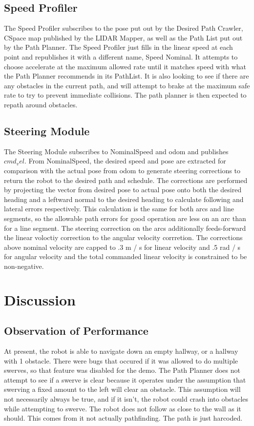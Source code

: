 \documentclass{article}
\begin{document}
\subsection{Speed Profiler}

The Speed Profiler subscribes to the pose put out by the Desired Path Crawler, CSpace map published by the LIDAR Mapper, as well as the Path List put out by the Path Planner.
The Speed Profiler just fills in the linear speed at each point and republishes it with a different name, Speed Nominal.
It attempts to choose accelerate at the maximum allowed rate until it matches speed with what the Path Planner recommends in its PathList.
It is also looking to see if there are any obstacles in the current path, and will attempt to brake at the maximum safe rate to try to prevent immediate collisions.
The path planner is then expected to repath around obstacles.

\subsection{Steering Module}

The Steering Module subscribes to NominalSpeed and odom and publishes $cmd_vel$.
From NominalSpeed, the desired speed and pose are extracted for comparison with the actual pose from odom to generate steering corrections to return the robot to the desired path and schedule.
The corrections are performed by projecting the vector from desired pose to actual pose onto both the desired heading and a leftward normal to the desired heading to calculate following and lateral errors respectively.
This calculation is the same for both arcs and line segments, so the allowable path errors for good operation are less on an arc than for a line segment.
The steering correction on the arcs additionally feeds-forward the linear voloctiy correction to the angular velocity corrretion.
The corrections above nominal velocity are capped to .3 m / s for linear velocity and .5 rad / s for angular velocity and the total commanded linear velocity is constrained to be non-negative.

\section{Discussion}
\subsection{Observation of Performance}

At present, the robot is able to navigate down an empty hallway, or a hallway with 1 obstacle.  There were bugs that occured if it was allowed to do multiple swerves, so that feature was disabled for the demo.
The Path Planner does not attempt to see if a swerve is clear because it operates under the assumption that swerving a fixed amount to the left will clear an obstacle.  
This assumption will not necessarily always be true, and if it isn't, the robot could crash into obstacles while attempting to swerve.
The robot does not follow as close to the wall as it should.  This comes from it not actually pathfinding.  The path is just harcoded.
\end{document}
